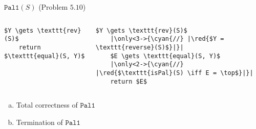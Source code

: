 
\begin{frame}[fragile]{}
  \begin{exampleblock}{$\texttt{Pal1}(S)$ (Problem $5.10$)}
    \begin{columns}
	\begin{lstlisting}[style = CStyle]
    $Y \gets \texttt{rev}(S)$
    return $\texttt{equal}(S, Y)$
        \end{lstlisting}
	\begin{lstlisting}[style = CStyle]
    $Y \gets \texttt{rev}(S)$
    |\only<3->{\cyan{//} |\red{$Y = \texttt{reverse}(S)$}|}|
    $E \gets \texttt{equal}(S, Y)$
    |\only<2->{\cyan{//} |\red{$\texttt{isPal}(S) \iff E = \top$}|}|
    return $E$
        \end{lstlisting}
    \end{columns}

    \begin{enumerate}[(a)]
      \item Total correctness of $\texttt{Pal1}$
      \item Termination of $\texttt{Pal1}$
    \end{enumerate}
  \end{exampleblock}

\end{frame}

